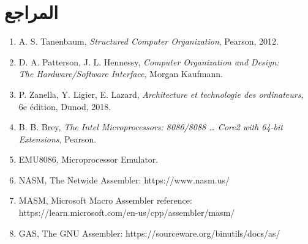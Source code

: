 \section*{المراجع}
\begin{enumerate}
    \item \textenglish{A. S. Tanenbaum, \emph{Structured Computer Organization}, Pearson, 2012.}
    \item \textenglish{D. A. Patterson, J. L. Hennessy, \emph{Computer Organization and Design:}}\\ \textenglish{\emph{The Hardware/Software Interface}, Morgan Kaufmann.}
    \item \textenglish{P. Zanella, Y. Ligier, E. Lazard, \emph{Architecture et technologie des ordinateurs}, 6e édition, Dunod, 2018.}
    \item \textenglish{B. B. Brey, \emph{The Intel Microprocessors: 8086/8088 \dots{} Core2 with 64-bit Extensions}, Pearson.}
    \item \textenglish{EMU8086, Microprocessor Emulator.}
    \item \textenglish{NASM, The Netwide Assembler: https://www.nasm.us/}
    \item \textenglish{MASM, Microsoft Macro Assembler reference:}\\ \textenglish{\small https://learn.microsoft.com/en-us/cpp/assembler/masm/}
    \item \textenglish{GAS, The GNU Assembler: https://sourceware.org/binutils/docs/as/}
\end{enumerate}
